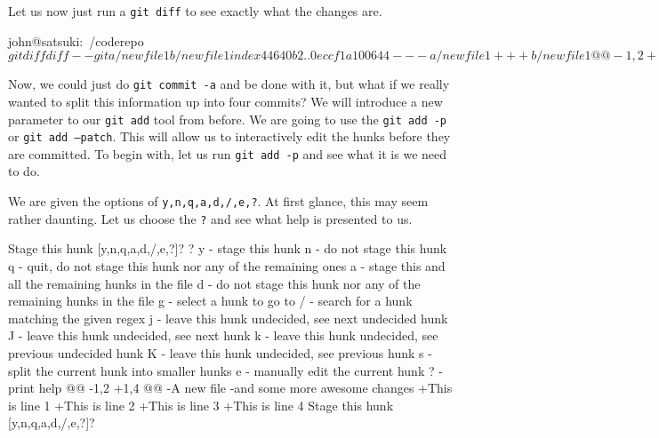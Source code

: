 Let us now just run a \texttt{git diff} to see exactly what the changes are.

\begin{code}
john@satsuki:~/coderepo$ git diff
diff --git a/newfile1 b/newfile1
index 44640b2..0eccf1a 100644
--- a/newfile1
+++ b/newfile1
@@ -1,2 +1,4 @@
-A new file
-and some more awesome changes
+This is line 1
+This is line 2
+This is line 3
+This is line 4
diff --git a/newfile2 b/newfile2
index 3545c1d..40efcce 100644
--- a/newfile2
+++ b/newfile2
@@ -1,2 +1,4 @@
 Another new file
 and a new awesome feature
+This is a new line
+This is another new line
john@satsuki:~/coderepo$ 
\end{code}

Now, we could just do \texttt{git commit -a} and be done with it, but what if we really wanted to split this information up into four commits?  We will introduce a new parameter to our \texttt{git add} tool from before.  We are going to use the \texttt{git add -p} or \texttt{git add --patch}.  This will allow us to interactively edit the hunks before they are committed.  To begin with, let us run \texttt{git add -p} and see what it is we need to do.


We are given the options of \texttt{y,n,q,a,d,/,e,?}.  At first glance, this may seem rather daunting.  Let us choose the \texttt{?} and see what help is presented to us.

\begin{code}
Stage this hunk [y,n,q,a,d,/,e,?]? ?   
y - stage this hunk
n - do not stage this hunk
q - quit, do not stage this hunk nor any of the remaining ones
a - stage this and all the remaining hunks in the file
d - do not stage this hunk nor any of the remaining hunks in the file
g - select a hunk to go to
/ - search for a hunk matching the given regex
j - leave this hunk undecided, see next undecided hunk
J - leave this hunk undecided, see next hunk
k - leave this hunk undecided, see previous undecided hunk
K - leave this hunk undecided, see previous hunk
s - split the current hunk into smaller hunks
e - manually edit the current hunk
? - print help
@@ -1,2 +1,4 @@
-A new file
-and some more awesome changes
+This is line 1
+This is line 2
+This is line 3
+This is line 4
Stage this hunk [y,n,q,a,d,/,e,?]? 
\end{code}

